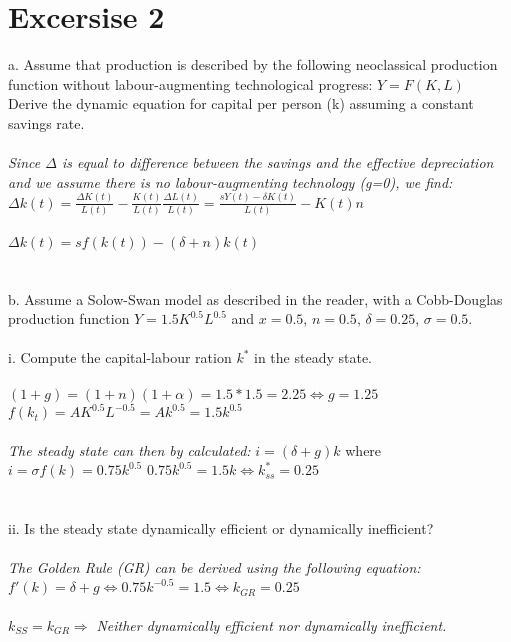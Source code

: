 \documentclass{article}
\begin{document}
\newpage
\section{Excersise 2}\label {sec:ex2}
a. Assume that production is described by the following neoclassical production function without labour-augmenting technological progress: $Y = F (K, L)$\\
Derive the dynamic equation for capital per person (k) assuming a constant savings rate.\\
\\
\textit{Since $\Delta$ is equal to difference between the savings and the effective depreciation and we assume there is no labour-augmenting technology (g=0), we find:}\\
$\Delta k(t) = \frac{\Delta K(t)}{L(t)} - \frac{K(t)}{L(t)} \frac{\Delta L(t)}{L(t)} 
= \frac{sY(t)-\delta K(t)}{L(t)} - K(t)n$\\
\\
$\Delta k(t) = sf(k(t)) - (\delta +n)k(t)$\\
\\
\\
b. Assume a Solow-Swan model as described in the reader, with a Cobb-Douglas production function $Y = 1.5K^{0.5}L^{0.5}$ and $x = 0.5$, $n = 0.5$, $\delta = 0.25$, $\sigma = 0.5$.\\
\\
i. Compute the capital-labour ration $k^*$ in the steady state.\\
\\
$(1+g)=(1+n)(1+\alpha) = 1.5 * 1.5 = 2.25 \Leftrightarrow g=1.25$\\
$f(k_t)=AK^{0.5}L^{-0.5} = Ak^{0.5} = 1.5k^{0.5}$\\
\\
\textit{The steady state can then by calculated:} $i = (\delta + g)k$ where $i=\sigma f(k) = 0.75k^{0.5}$
$0.75k^{0.5} = 1.5k \Leftrightarrow k_{ss}^*=0.25$\\
\\
\\
ii. Is the steady state dynamically efficient or dynamically inefficient?\\
\\
\textit{The Golden Rule (GR) can be derived using the following equation:}\\
$f'(k) = \delta +g \Leftrightarrow 0.75k^{-0.5}=1.5\Leftrightarrow k_{GR}=0.25$ \\
\\
$k_{SS}=k_{GR}\Rightarrow$ \textit{Neither dynamically efficient nor dynamically inefficient.}






	
\end{document}
